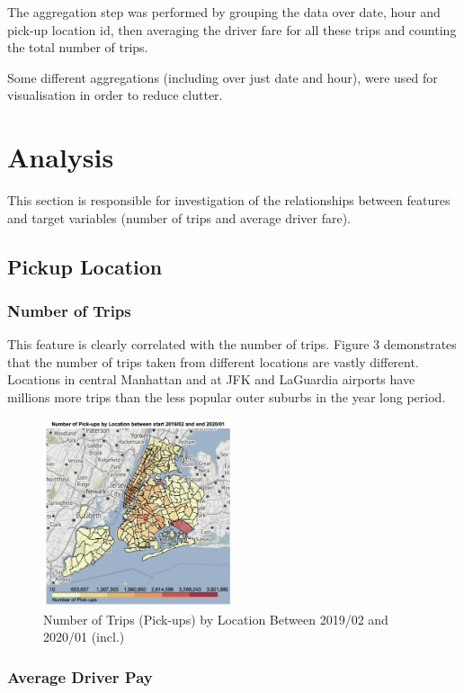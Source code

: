 \documentclass[11pt]{article}
\begin{document}
The aggregation step was performed by grouping the data over date, hour and pick-up location id, then averaging the driver fare for all these trips and counting the total number of trips.

Some different aggregations (including over just date and hour), were used for visualisation in order to reduce clutter.

\section{Analysis}

This section is responsible for investigation of the relationships between features and target variables (number of trips and average driver fare).

\subsection{Pickup Location}

\subsubsection{Number of Trips}

This feature is clearly correlated with the number of trips. Figure 3 demonstrates that the number of trips taken from different locations are vastly different. Locations in central Manhattan and at JFK and LaGuardia airports have millions more trips than the less popular outer suburbs in the year long period.

\begin{figure}[h]
    \includegraphics[width=0.5\textwidth]{plots/num_trips_map.png}
    \centering
    \caption{Number of Trips (Pick-ups) by Location Between 2019/02 and 2020/01 (incl.)}
\end{figure}

\subsubsection{Average Driver Pay}
\end{document}
